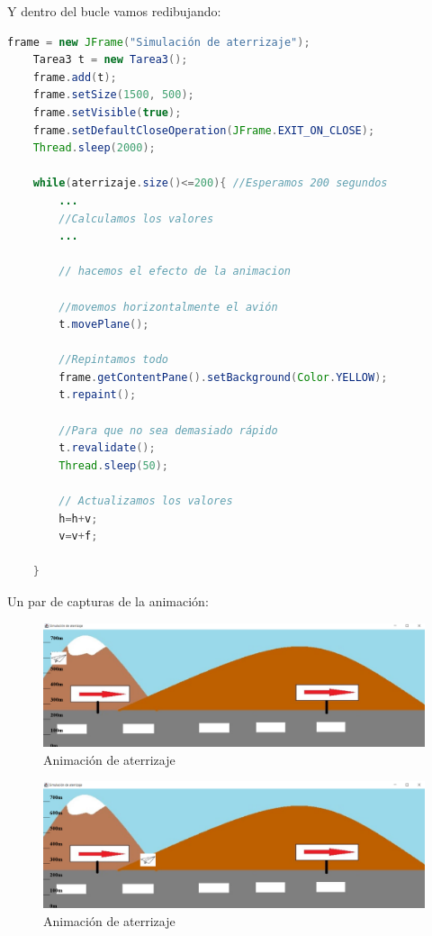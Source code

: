 \documentclass[
]{article}
\begin{document}
Y dentro del bucle vamos redibujando:

\begin{lstlisting}[language=Java, caption=Dibujamos el fondo y la imagen]
  frame = new JFrame("Simulación de aterrizaje");
    Tarea3 t = new Tarea3();
    frame.add(t);
    frame.setSize(1500, 500);
    frame.setVisible(true);
    frame.setDefaultCloseOperation(JFrame.EXIT_ON_CLOSE);
    Thread.sleep(2000);
    
    while(aterrizaje.size()<=200){ //Esperamos 200 segundos
        ...
        //Calculamos los valores
        ...
        
        // hacemos el efecto de la animacion
        
        //movemos horizontalmente el avión
        t.movePlane();
        
        //Repintamos todo
        frame.getContentPane().setBackground(Color.YELLOW);
        t.repaint();
           
        //Para que no sea demasiado rápido
        t.revalidate();
        Thread.sleep(50);
        
        // Actualizamos los valores
        h=h+v;
        v=v+f;
        
    }
\end{lstlisting}

Un par de capturas de la animación:

\begin{figure}
\centering
\includegraphics{pegado6.png}
\caption{Animación de aterrizaje}
\end{figure}

\begin{figure}
\centering
\includegraphics{pegado7.png}
\caption{Animación de aterrizaje}
\end{figure}
\end{document}
